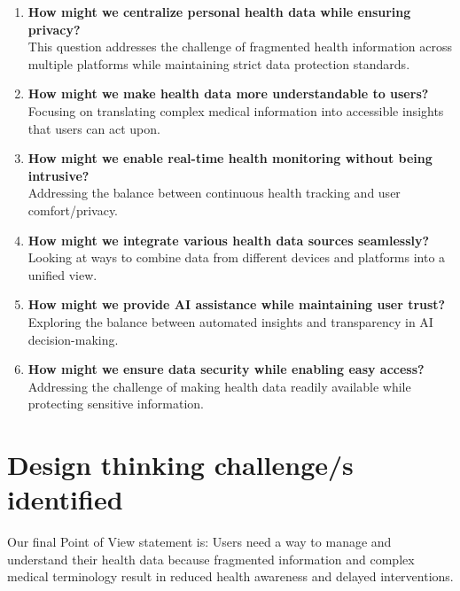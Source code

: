 \begin{enumerate}
    \item \textbf{How might we centralize personal health data while ensuring privacy?}\\
    This question addresses the challenge of fragmented health information across multiple platforms while maintaining strict data protection standards.

    \item \textbf{How might we make health data more understandable to users?}\\
    Focusing on translating complex medical information into accessible insights that users can act upon.

    \item \textbf{How might we enable real-time health monitoring without being intrusive?}\\
    Addressing the balance between continuous health tracking and user comfort/privacy.

    \item \textbf{How might we integrate various health data sources seamlessly?}\\
    Looking at ways to combine data from different devices and platforms into a unified view.

    \item \textbf{How might we provide AI assistance while maintaining user trust?}\\
    Exploring the balance between automated insights and transparency in AI decision-making.

    \item \textbf{How might we ensure data security while enabling easy access?}\\
    Addressing the challenge of making health data readily available while protecting sensitive information.
\end{enumerate}

\section{Design thinking challenge/s identified}

Our final Point of View statement is: Users need a way to manage and understand their health data because fragmented information and complex medical terminology result in reduced health awareness and delayed interventions.


